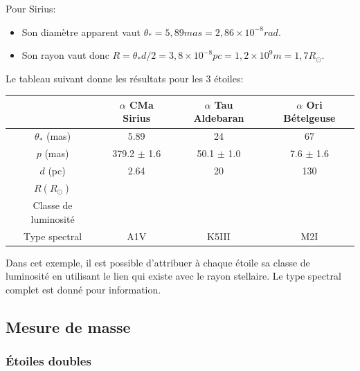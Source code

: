 \documentclass[a4paper,10pt]{report}
\begin{document}
\begin{Answer}
  Pour Sirius:
  \begin{itemize}
  \item Son diamètre apparent vaut $\theta_*= 5,89 mas = 2,86 \times
    10^{-8} rad$.
  \item Son rayon vaut donc $R = \theta_* d / 2 = 3,8 \times 10^{-8}
    pc = 1,2 \times 10^9 m = 1,7R_{\odot}$.
  \end{itemize}
  Le tableau suivant donne les résultats pour les 3 étoiles:
  \begin{center}
    \begin{tabular}{|c|c|c|c|}
      \hline
      & $\alpha$ CMa Sirius & $\alpha$ Tau Aldebaran & $\alpha$ Ori
      Bételgeuse \\
      \hline
      $\theta_*$ (mas) & 5.89 & 24 & 67 \\
      \hline
      $p$ (mas) & 379.2 $\pm$ 1.6 & 50.1 $\pm$ 1.0 & 7.6 $\pm$ 1.6 \\
      \hline
      $d$ (pc) & 2.64  & 20  & 130 \\
      \hline
      $R (R_{\odot})$ & \color{red}{1.7}  & \color{red}{52}  &
      \color{red}{936} \\
      \hline
      Classe de luminosité & \color{red}{V}  & \color{red}{III}  &
      \color{red}{I} \\
      \hline
      Type spectral & A1V  & K5III  & M2I \\
      \hline
    \end{tabular}
  \end{center}
  Dans cet exemple, il est possible d'attribuer à chaque étoile sa
  classe de luminosité en utilisant le lien qui existe avec le rayon
  stellaire. Le type spectral complet est donné pour information.
\end{Answer}

\subsection{Mesure de masse}

\subsubsection{Étoiles doubles}
\end{document}
